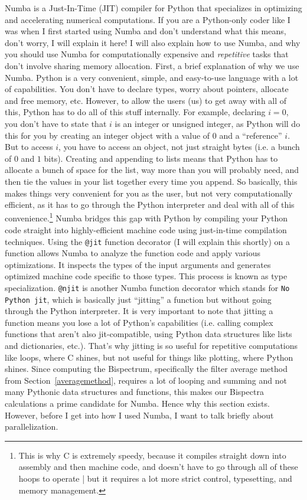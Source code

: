 \documentclass[11pt]{article}
\renewcommand{\_}[1]{\underline{ #1 }}
\newcommand{\npar}{\vspace{.3cm}\newline}
\begin{document}
{Numba is a Just-In-Time (JIT) compiler for Python that specializes in optimizing and accelerating numerical computations. If you are a Python-only coder like I was when I first started using Numba and don't understand what this means, don't worry, I will explain it here! I will also explain how to use Numba, and why you should use Numba for computationally expensive and \textit{repetitive} tasks that don't involve sharing memory allocation.
\npar
First, a brief explanation of why we use Numba. Python is a very convenient, simple, and easy-to-use language with a lot of capabilities. You don't have to declare types, worry about pointers, allocate and free memory, etc. However, to allow the users (us) to get away with all of this, Python has to do all of this stuff internally. For example, declaring $i = 0$, you don't have to state that $i$ is an integer or unsigned integer, as Python will do this for you by creating an integer object with a value of $0$ and a ``reference'' $i$. But to access $i$, you have to access an object, not just straight bytes (i.e. a bunch of $0$ and $1$ bits). Creating and appending to lists means that Python has to allocate a bunch of space for the list, way more than you will probably need, and then tie the values in your list together every time you append. So basically, this makes things very convenient for you as the user, but not very computationally efficient, as it has to go through the Python interpreter and deal with all of this convenience.\footnote{This is why C is extremely speedy, because it compiles straight down into assembly and then machine code, and doesn't have to go through all of these hoops to operate | but it requires a lot more strict control, typesetting, and memory management.}
\npar
Numba bridges this gap with Python by compiling your Python code straight into highly-efficient machine code using just-in-time compilation techniques. Using the \texttt{@jit} function decorator (I will explain this shortly) on a function allows Numba to analyze the function code and apply various optimizations. It inspects the types of the input arguments and generates optimized machine code specific to those types. This process is known as type specialization. \texttt{@njit} is another Numba function decorator which stands for \texttt{No Python jit}, which is basically just ``jitting'' a function but without going through the Python interpreter. It is very important to note that jitting a function means you lose a lot of Python's capabilities (i.e. calling complex functions that aren't also jit-compatible, using Python data structures like lists and dictionaries, etc.). That's why jitting is so useful for repetitive computations like loops, where C shines, but not useful for things like plotting, where Python shines. Since computing the Bispectrum, specifically the filter average method from Section~\ref{averagemethod}, requires a lot of looping and summing and not many Pythonic data structures and functions, this makes our Bispectra calculations a prime candidate for Numba. Hence why this section exists. However, before I get into how I used Numba, I want to talk briefly about parallelization.
}
\end{document}
